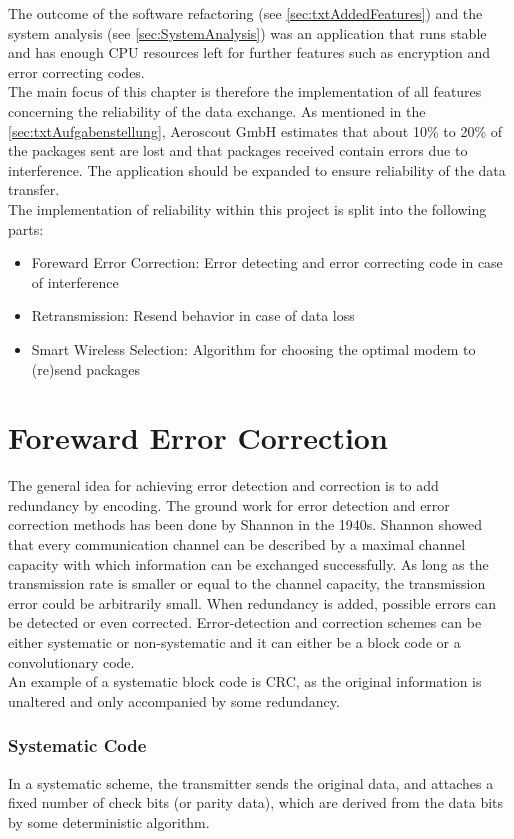 %
The outcome of the software refactoring (see \autoref{sec:txtAddedFeatures}) and the system analysis (see \autoref{sec:SystemAnalysis}) was an application that runs stable and has enough CPU resources left for further features such as encryption and error correcting codes.\\
The main focus of this chapter is therefore the implementation of all features concerning the reliability of the data exchange. As mentioned in the \autoref{sec:txtAufgabenstellung}, Aeroscout GmbH estimates that about 10\% to 20\% of the packages sent are lost and that packages received contain errors due to interference. The application should be expanded to ensure reliability of the data transfer.\\
The implementation of reliability within this project is split into the following parts:
\begin{itemize}
    \item Foreward Error Correction: Error detecting and error correcting code in case of interference
    \item Retransmission: Resend behavior in case of data loss
    \item Smart Wireless Selection: Algorithm for choosing the optimal modem to (re)send packages
\end{itemize}
%
%
%
%
%
\section{Foreward Error Correction}
The general idea for achieving error detection and correction is to add redundancy by encoding. The ground work for error detection and error correction methods has been done by Shannon in the 1940s. Shannon showed that every communication channel can be described by a maximal channel capacity with which information can be exchanged successfully. As long as the transmission rate is smaller or equal to the channel capacity, the transmission error could be arbitrarily small. When redundancy is added, possible errors can be detected or even corrected. Error-detection and correction schemes can be either systematic or non-systematic and it can either be a block code or a convolutionary code.\\
An example of a systematic block code is CRC, as the original information is unaltered and only accompanied by some redundancy.
%
\subsubsection{Systematic Code}
In a systematic scheme, the transmitter sends the original data, and attaches a fixed number of check bits (or parity data), which are derived from the data bits by some deterministic algorithm.
